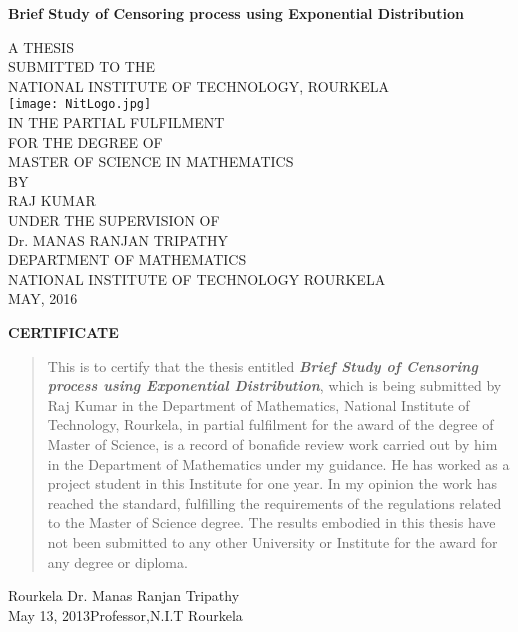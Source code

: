 \documentclass[12pt]{article}
\begin{document}
\thispagestyle{empty}
\begin{center}
\textrm{\textbf{\large Brief Study of Censoring  process using Exponential Distribution}}
\end{center}
\vspace{0.5cm}
\begin{center}
A THESIS \\
SUBMITTED TO THE\\
NATIONAL INSTITUTE OF TECHNOLOGY, ROURKELA\\
\texttt{[image: NitLogo.jpg]}\\
IN THE PARTIAL FULFILMENT\\
FOR THE DEGREE OF \\
MASTER OF SCIENCE IN MATHEMATICS\\
BY\\
RAJ KUMAR\\
UNDER THE SUPERVISION OF\\
Dr. MANAS RANJAN TRIPATHY \\
\nopagebreak
DEPARTMENT OF MATHEMATICS\\
NATIONAL INSTITUTE OF TECHNOLOGY ROURKELA\\
MAY, 2016
\end{center}





\newpage
{}
\begin{center}
\textbf{\Large CERTIFICATE}
\end{center}
\vspace{2cm}
\begin{quote}
This is to certify that the thesis entitled  \textbf{\textit {Brief Study of Censoring process using Exponential Distribution}}, which is being submitted by Raj Kumar in the Department of Mathematics, National Institute of Technology, Rourkela, in partial fulfilment for the award of the degree of Master of Science, is a record of bonafide review work carried out by him in the Department of Mathematics under my guidance. He has worked as a project student in this Institute for one year. In my opinion the work has reached the standard, fulfilling the requirements of the regulations related to the Master of Science degree. The results embodied in this thesis have not been submitted to any other University or Institute for the award for any degree or diploma.
\end{quote}
\begin{flushleft}
	Rourkela  \hfill Dr. Manas Ranjan Tripathy\\
	May 13, 2013\hfill Professor,N.I.T Rourkela
\end{flushleft} 
\end{document}
